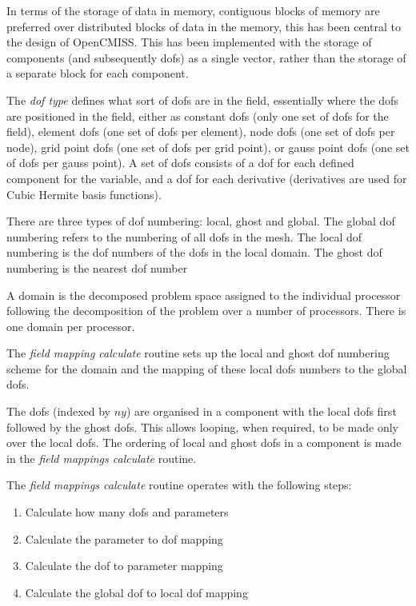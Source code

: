 In terms of the storage of data in memory, contiguous blocks of memory are 
preferred over distributed blocks of data in the memory, this has been central 
to the design of OpenCMISS. This has been implemented with the storage of 
components (and subsequently dofs) as a single vector, rather than the storage 
of a separate block for each component.

The \emph{dof type} defines what sort of dofs are in the field, essentially where 
the dofs are positioned in the field, either as constant dofs (only one set 
of dofs for the field), element dofs (one set of dofs per element), node dofs 
(one set of dofs per node), grid point dofs (one set of dofs per grid point), 
or gauss point dofs (one set of dofs per gauss point). A set of dofs consists 
of a dof for each defined component for the variable, and a dof for each 
derivative (derivatives are used for Cubic Hermite basis functions).

There are three types of dof numbering: local, ghost and global. The global dof 
numbering refers to the numbering of all dofs in the mesh. The local dof
numbering is the dof numbers of the dofs in the local domain. The ghost dof 
numbering is the nearest dof number 

A domain is the decomposed problem space assigned to the individual processor 
following the decomposition of the problem over a number of processors. There
is one domain per processor. 

The \emph{field mapping calculate} routine sets up the local and ghost dof numbering 
scheme for the domain and the mapping of these local dofs numbers to the global 
dofs.

The dofs (indexed by $ny$) are organised in a component with the local dofs first 
followed by the ghost dofs. This allows looping, when required, to be made only 
over the local dofs. The ordering of local and ghost dofs in a component is
made in the \emph{field mappings calculate} routine.

The \emph{field mappings calculate} routine operates with the following steps:

\begin{enumerate}
 \item Calculate how many dofs and parameters
 \item Calculate the parameter to dof mapping
 \item Calculate the dof to parameter mapping
 \item Calculate the global dof to local dof mapping
\end{enumerate}


